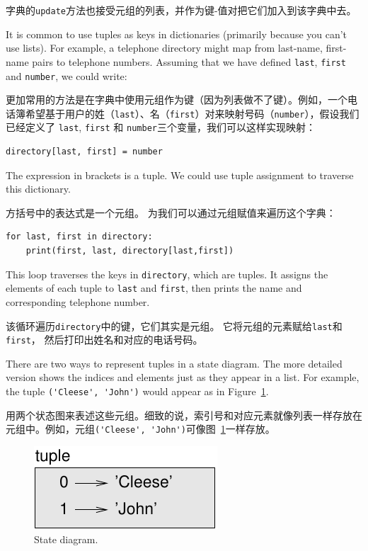 字典的\lstinline{update}方法也接受元组的列表，并作为键-值对把它们加入到该字典中去。
  

It is common to use tuples as keys in dictionaries (primarily because
you can't use lists).  For example, a telephone directory might map
from last-name, first-name pairs to telephone numbers.  Assuming
that we have defined {\tt last}, {\tt first} and {\tt number}, we
could write:

更加常用的方法是在字典中使用元组作为键（因为列表做不了键）。例如，一个电话簿希望基于用户的姓（\lstinline {last}）、名（\lstinline {first}）对来映射号码（\lstinline {number}），假设我们已经定义了 \lstinline {last}, \lstinline {first} 和 \lstinline {number}三个变量，我们可以这样实现映射：

\begin{lstlisting}
directory[last, first] = number
\end{lstlisting}
%
The expression in brackets is a tuple.  We could use tuple
assignment to traverse this dictionary.

方括号中的表达式是一个元组。 为我们可以通过元组赋值来遍历这个字典：

\begin{lstlisting}
for last, first in directory:
    print(first, last, directory[last,first])
\end{lstlisting}

%
This loop traverses the keys in {\tt directory}, which are tuples.  It
assigns the elements of each tuple to {\tt last} and {\tt first}, then
prints the name and corresponding telephone number.

该循环遍历\lstinline{directory}中的键，它们其实是元组。
它将元组的元素赋给\lstinline{last}和\lstinline{first}， 然后打印出姓名和对应的电话号码。

There are two ways to represent tuples in a state diagram.  The more
detailed version shows the indices and elements just as they appear in
a list.  For example, the tuple \verb"('Cleese', 'John')" would appear
as in Figure~\ref{fig.tuple1}.

用两个状态图来表述这些元组。细致的说，索引号和对应元素就像列表一样存放在元组中。例如，元组\lstinline{('Cleese', 'John')}可像图~\ref{fig.tuple1}一样存放。
 

\begin{figure}
\centerline
{\includegraphics[scale=0.8]{figs/tuple1.pdf}}
\caption{State diagram.}
\label{fig.tuple1}
\end{figure}

